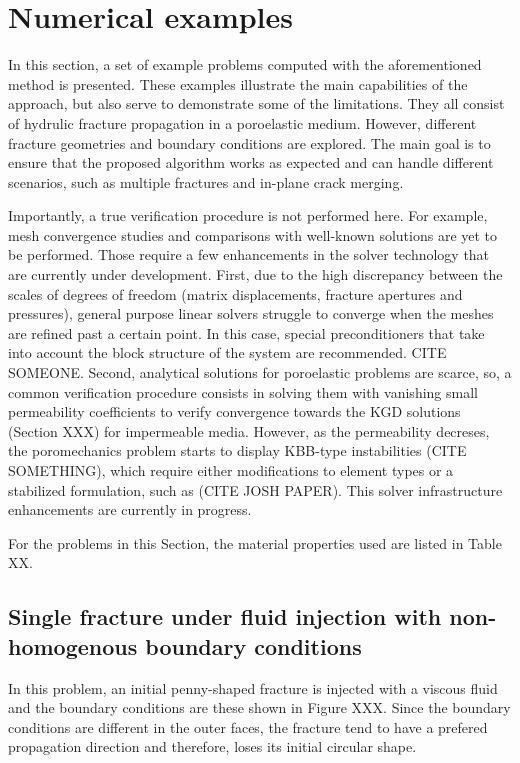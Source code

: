 \section{Numerical examples}
\label{section: Chapter4/examples}

In this section, a set of example problems computed with the aforementioned method is presented. These examples illustrate the main capabilities of the approach, but also serve to demonstrate some of the limitations. They all consist of hydrulic fracture propagation in a poroelastic medium. However, different fracture geometries and boundary conditions are explored. The main goal is to ensure that the proposed algorithm works as expected and can handle different scenarios, such as multiple fractures and in-plane crack merging.

Importantly, a true verification procedure is not performed here. For example, mesh convergence studies and comparisons with well-known solutions are yet to be performed. Those require a few enhancements in the solver technology that are currently under development. First, due to the high discrepancy between the scales of degrees of freedom (matrix displacements, fracture apertures and pressures), general purpose linear solvers struggle to converge when the meshes are refined past a certain point. In this case, special preconditioners that take into account the block structure of the system are recommended. CITE SOMEONE. Second, analytical solutions for poroelastic problems are scarce, so, a common verification procedure consists in solving them with vanishing small permeability coefficients to verify convergence towards the KGD solutions (Section XXX) for impermeable media. However, as the permeability decreses, the poromechanics problem starts to display KBB-type instabilities (CITE SOMETHING), which require either modifications to element types or a stabilized formulation, such as (CITE JOSH PAPER). This solver infrastructure enhancements are currently in progress.

For the problems in this Section, the material properties used are listed in Table XX. 


\subsection{Single fracture under fluid injection with non-homogenous boundary conditions}

In this problem, an initial penny-shaped fracture is injected with a viscous fluid and the boundary conditions are these shown in Figure XXX. Since the boundary conditions are different in the outer faces, the fracture tend to have a prefered propagation direction and therefore, loses its initial circular shape. 

